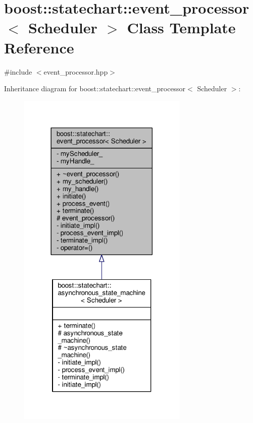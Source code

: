\hypertarget{classboost_1_1statechart_1_1event__processor}{}\section{boost\+:\+:statechart\+:\+:event\+\_\+processor$<$ Scheduler $>$ Class Template Reference}
\label{classboost_1_1statechart_1_1event__processor}


{\ttfamily \#include $<$event\+\_\+processor.\+hpp$>$}



Inheritance diagram for boost\+:\+:statechart\+:\+:event\+\_\+processor$<$ Scheduler $>$\+:
\nopagebreak
\begin{figure}[H]
\begin{center}
\leavevmode
\includegraphics[width=230pt]{classboost_1_1statechart_1_1event__processor__inherit__graph}
\end{center}
\end{figure}


